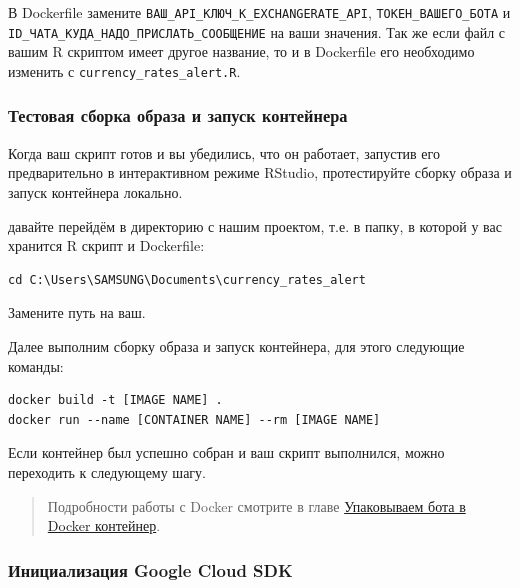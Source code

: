\documentclass[
]{book}
\begin{document}
В Dockerfile замените \texttt{ВАШ\_API\_КЛЮЧ\_К\_EXCHANGERATE\_API}, \texttt{ТОКЕН\_ВАШЕГО\_БОТА} и \texttt{ID\_ЧАТА\_КУДА\_НАДО\_ПРИСЛАТЬ\_СООБЩЕНИЕ} на ваши значения. Так же если файл с вашим R скриптом имеет другое название, то и в Dockerfile его необходимо изменить с \texttt{currency\_rates\_alert.R}.

\subsubsection{Тестовая сборка образа и запуск контейнера}\label{ux442ux435ux441ux442ux43eux432ux430ux44f-ux441ux431ux43eux440ux43aux430-ux43eux431ux440ux430ux437ux430-ux438-ux437ux430ux43fux443ux441ux43a-ux43aux43eux43dux442ux435ux439ux43dux435ux440ux430}

Когда ваш скрипт готов и вы убедились, что он работает, запустив его предварительно в интерактивном режиме RStudio, протестируйте сборку образа и запуск контейнера локально.

давайте перейдём в директорию с нашим проектом, т.е. в папку, в которой у вас хранится R скрипт и Dockerfile:

\begin{verbatim}
cd C:\Users\SAMSUNG\Documents\currency_rates_alert
\end{verbatim}

Замените путь на ваш.

Далее выполним сборку образа и запуск контейнера, для этого следующие команды:

\begin{verbatim}
docker build -t [IMAGE NAME] .
docker run --name [CONTAINER NAME] --rm [IMAGE NAME]
\end{verbatim}

Если контейнер был успешно собран и ваш скрипт выполнился, можно переходить к следующему шагу.

\begin{quote}
Подробности работы с Docker смотрите в главе \hyperref[ux443ux43fux430ux43aux43eux432ux44bux432ux430ux435ux43c-ux431ux43eux442ux430-ux432-docker-ux43aux43eux43dux442ux435ux439ux43dux435ux440]{Упаковываем бота в Docker контейнер}.
\end{quote}

\subsubsection{Инициализация Google Cloud SDK}\label{ux438ux43dux438ux446ux438ux430ux43bux438ux437ux430ux446ux438ux44f-google-cloud-sdk}
\end{document}
